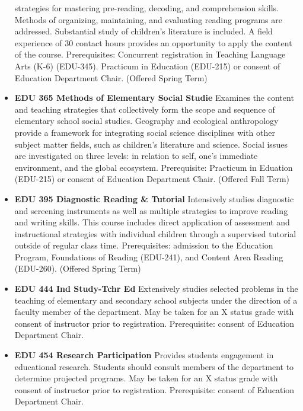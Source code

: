 \documentclass[
  letterpaper,
]{scrbook}
\begin{document}
\begin{itemize}
  strategies for mastering pre-reading, decoding, and comprehension
  skills. Methods of organizing, maintaining, and evaluating reading
  programs are addressed. Substantial study of children's literature is
  included. A field experience of 30 contact hours provides an
  opportunity to apply the content of the course. Prerequisites:
  Concurrent registration in Teaching Language Arts (K-6) (EDU-345).
  Practicum in Education (EDU-215) or consent of Education Department
  Chair. (Offered Spring Term)\\
\item
  \textbf{EDU 365 Methods of Elementary Social Studie} Examines the
  content and teaching strategies that collectively form the scope and
  sequence of elementary school social studies. Geography and ecological
  anthropology provide a framework for integrating social science
  disciplines with other subject matter fields, such as children's
  literature and science. Social issues are investigated on three
  levels: in relation to self, one's immediate environment, and the
  global ecosystem. Prerequisite: Practicum in Eduation (EDU-215) or
  consent of Education Department Chair. (Offered Fall Term)\\
\item
  \textbf{EDU 395 Diagnostic Reading \& Tutorial} Intensively studies
  diagnostic and screening instruments as well as multiple strategies to
  improve reading and writing skills. This course includes direct
  application of assessment and instructional strategies with individual
  children through a supervised tutorial outside of regular class time.
  Prerequisites: admission to the Education Program, Foundations of
  Reading (EDU-241), and Content Area Reading (EDU-260). (Offered Spring
  Term)\\
\item
  \textbf{EDU 444 Ind Study-Tchr Ed} Extensively studies selected
  problems in the teaching of elementary and secondary school subjects
  under the direction of a faculty member of the department. May be
  taken for an X status grade with consent of instructor prior to
  registration. Prerequisite: consent of Education Department Chair.\\
\item
  \textbf{EDU 454 Research Participation} Provides students engagement
  in educational research. Students should consult members of the
  department to determine projected programs. May be taken for an X
  status grade with consent of instructor prior to registration.
  Prerequisite: consent of Education Department Chair.\\

\end{itemize}
\end{document}
